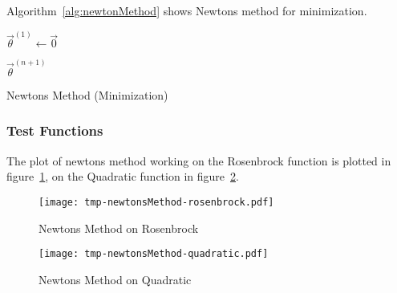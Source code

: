 			Algorithm~\ref{alg:newtonMethod} shows Newtons method for minimization.

			\begin{algorithm}
				\(\vec{\theta}^{(1)} \gets \vec{0}\)


				\Return \(\vec{\theta}^{(n + 1)}\)

				\caption{Newtons Method (Minimization)}
				\label{alg:newtonMethod}
			\end{algorithm}

			\subsubsection{Test Functions}
				The plot of newtons method working on the Rosenbrock function is plotted in figure~\ref{fig:newtonsMethodExampleRosenbrock}, on the Quadratic function in figure~\ref{fig:newtonsMethodExampleQuadratic}.

				\begin{figure}
					\centering
					\texttt{[image: tmp-newtonsMethod-rosenbrock.pdf]}
					\caption{Newtons Method on Rosenbrock}
					\label{fig:newtonsMethodExampleRosenbrock}
				\end{figure}
				\begin{figure}
					\centering
					\texttt{[image: tmp-newtonsMethod-quadratic.pdf]}
					\caption{Newtons Method on Quadratic}
					\label{fig:newtonsMethodExampleQuadratic}
				\end{figure}

